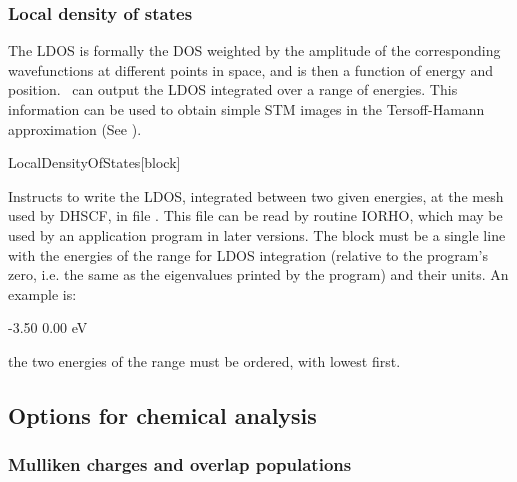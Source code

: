 \subsubsection{Local density of states}

The LDOS is formally the DOS weighted by the amplitude of the
corresponding wavefunctions at different points in space, and is then
a function of energy and position. \siesta\ can output the LDOS
integrated over a range of energies. This information can be used to
obtain simple STM images in the Tersoff-Hamann approximation (See
).

\begin{fdfentry}{LocalDensityOfStates}[block]
  
  Instructs to write the LDOS, integrated between two given energies,
  at the mesh used by DHSCF, in file . This file can be
  read by routine IORHO, which may be used by an application program
  in later versions.  The block must be a single line with the
  energies of the range for LDOS integration (relative to the
  program's zero, i.e. the same as the eigenvalues printed by the
  program) and their units.  An example is:
  \begin{fdfexample}
        -3.50  0.00   eV
  \end{fdfexample}

  \note the two energies of the range must be ordered, with lowest
  first.

\end{fdfentry}



\subsection{Options for chemical analysis}

\subsubsection{Mulliken charges and overlap populations}


